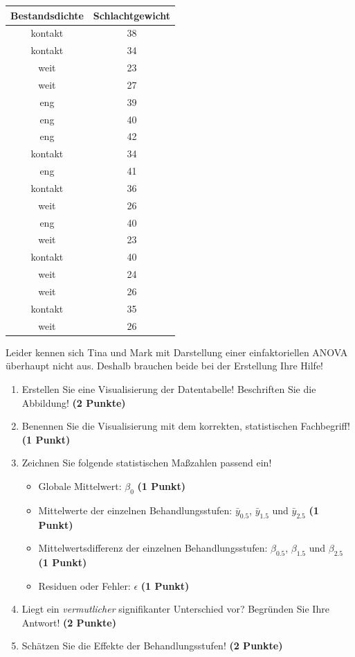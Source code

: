 \documentclass[a4paper, 9pt]{scrartcl}\usepackage[]{graphicx}\usepackage[]{xcolor}
\newenvironment{knitrout}{}{} %
\begin{document}
\begin{knitrout}
\color{fgcolor}\begin{table}[!h]
\centering
\begin{tabular}{cc}
\toprule
Bestandsdichte & Schlachtgewicht\\
\midrule
kontakt & 38\\
kontakt & 34\\
weit & 23\\
weit & 27\\
eng & 39\\
\addlinespace
eng & 40\\
eng & 42\\
kontakt & 34\\
eng & 41\\
kontakt & 36\\
\addlinespace
weit & 26\\
eng & 40\\
weit & 23\\
kontakt & 40\\
weit & 24\\
\addlinespace
weit & 26\\
kontakt & 35\\
weit & 26\\
\bottomrule
\end{tabular}
\end{table}

\end{knitrout}

Leider kennen sich Tina und Mark mit Darstellung einer einfaktoriellen ANOVA überhaupt nicht aus. Deshalb brauchen beide bei der Erstellung Ihre Hilfe! 

\begin{enumerate}
\item Erstellen  Sie  eine  Visualisierung  der  Datentabelle! Beschriften  Sie  die  Abbildung! \textbf{(2 Punkte)}
\item Benennen Sie die Visualisierung mit dem korrekten, statistischen Fachbegriff! \textbf{(1 Punkt)}
\item Zeichnen Sie folgende statistischen Maßzahlen passend ein! 
  \begin{itemize}
  \item Globale Mittelwert: $\beta_0$ \textbf{(1 Punkt)}
  \item Mittelwerte der einzelnen Behandlungsstufen: $\bar{y}_{0.5}$, $\bar{y}_{1.5}$ und $\bar{y}_{2.5}$ \textbf{(1 Punkt)}
  \item Mittelwertsdifferenz der einzelnen Behandlungsstufen: $\beta_{0.5}$, $\beta_{1.5}$ und $\beta_{2.5}$ \textbf{(1 Punkt)}
  \item Residuen oder Fehler: $\epsilon$ \textbf{(1 Punkt)}
  \end{itemize}
\item Liegt ein \textit{vermutlicher} signifikanter Unterschied vor? Begründen Sie Ihre Antwort! \textbf{(2 Punkte)}
\item Schätzen Sie die Effekte der Behandlungsstufen! \textbf{(2 Punkte)}
\end{enumerate}
 
\end{document}
